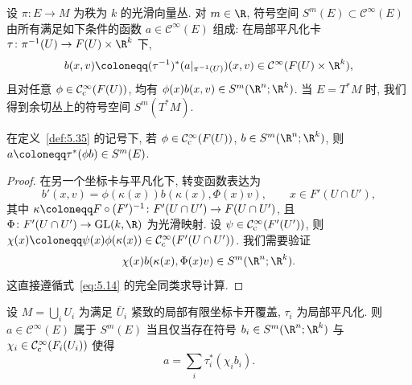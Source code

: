 \begin{definition}[向量丛上的符号空间]\label{def:5.35}
设 $\pi \colon E \to M$ 为秩为 $k$ 的光滑向量丛. 对 $m \in \R$, 符号空间 $S^m(E) \subset \mathcal{C}^\infty(E)$ 由所有满足如下条件的函数 $a \in \mathcal{C}^\infty(E)$ 组成: 在局部平凡化卡 $\tau \colon \pi^{-1}(U) \to F(U) \times \R^k$ 下,
\begin{equation}\label{eq:5.80}
    b(x, v) \defeq (\tau^{-1})^* (a|_{\pi^{-1}(U)})(x, v) \in \mathcal{C}^\infty(F(U) \times \R^k),
\end{equation}
且对任意 $\phi \in \mathcal{C}_{\mathrm{c}}^\infty(F(U))$, 均有 $\phi(x) b(x, v) \in S^m(\R^n; \R^k)$. 当 $E = T^* M$ 时, 我们得到余切丛上的符号空间 $S^m(T^* M)$.
\end{definition}

\begin{lemma}[坐标卡内定义的符号延拓]\label{lem:5.36}
在定义~\ref{def:5.35} 的记号下, 若 $\phi \in \mathcal{C}_{\mathrm{c}}^\infty(F(U))$, $b \in S^m(\R^n; \R^k)$, 则 $a \defeq \tau^*(\phi b) \in S^m(E)$.
\end{lemma}

\begin{proof}
在另一个坐标卡与平凡化下, 转变函数表达为
\begin{equation}\label{eq:5.81}
    b'(x, v) = \phi(\kappa(x)) b(\kappa(x), \Phi(x) v), \qquad x \in F'(U \cap U'),
\end{equation}
其中 $\kappa \defeq F \circ (F')^{-1} \colon F'(U \cap U') \to F(U \cap U')$, 且 $\Phi \colon F'(U \cap U') \to \mathrm{GL}(k, \R)$ 为光滑映射. 设 $\psi \in \mathcal{C}_{\mathrm{c}}^\infty(F'(U'))$, 则 $\chi(x) \defeq \psi(x) \phi(\kappa(x)) \in \SmoothComp(F'(U \cap U'))$. 我们需要验证
\begin{equation}\label{eq:5.82}
    \chi(x) b(\kappa(x), \Phi(x) v) \in S^m(\R^n; \R^k).
\end{equation}
这直接遵循式~\eqref{eq:5.14} 的完全同类求导计算.
\end{proof}

\begin{corollary}[通过坐标卡刻画符号空间]\label{cor:5.37}
设 $M = \bigcup_i U_i$ 为满足 $\bar{U}_i$ 紧致的局部有限坐标卡开覆盖, $\tau_i$ 为局部平凡化. 则 $a \in \mathcal{C}^\infty(E)$ 属于 $S^m(E)$ 当且仅当存在符号 $b_i \in S^m(\R^n; \R^k)$ 与 $\chi_i \in \mathcal{C}_{\mathrm{c}}^\infty(F_i(U_i))$ 使得
\begin{equation}\label{eq:5.83}
    a = \sum_i \tau_i^* (\chi_i b_i).
\end{equation}
\end{corollary}

